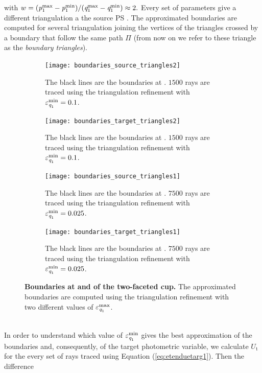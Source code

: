 with $w= (\textit{p}_1^{\textrm{max}}-\textit{p}_1^{\textrm{min}})/(\textit{q}_1^{\textrm{max}}-\textit{q}_1^{\textrm{min}})\approx 2.$ 
Every set of parameters give a different triangulation a the source PS . The approximated boundaries are computed for several triangulation joining the vertices of the triangles crossed by a boundary that follow the same path $\Pi$ (from now on we refer to these triangle as the \textit{boundary triangles}). 
\begin{figure}[h!]
\centering
\begin{subfigure}{.45\textwidth}
  \texttt{[image: boundaries\_source\_triangles2]}
 \caption{The black lines are the boundaries at . $1500$ rays are traced using the triangulation refinement with $\varepsilon_{\textit{q}_1}^{\textrm{min}}=0.1$. }
  \label{fig:boundaries_s2}
\end{subfigure}%
\hfill
\begin{subfigure}{.45\textwidth}
  \texttt{[image: boundaries\_target\_triangles2]}
  \caption{The black lines are the boundaries at . $1500$ rays are traced using the triangulation refinement with $\varepsilon_{\textit{q}_1}^{\textrm{min}}=0.1$.} %
  \label{fig:boundaries_t2}
\end{subfigure} %
\hfill
\begin{subfigure}{.45\textwidth}
  \texttt{[image: boundaries\_source\_triangles1]}
  \caption{The black lines are the boundaries at . $7500$ rays are traced using the triangulation refinement with $\varepsilon_{\textit{q}_1}^{\textrm{min}}=0.025$.}
  \label{fig:boundaries_s1}
\end{subfigure}%
\hfill
\begin{subfigure}{.45\textwidth}
  \texttt{[image: boundaries\_target\_triangles1]}
 \caption{The black lines are the boundaries at . $7500$ rays are traced using the triangulation refinement with $\varepsilon_{\textit{q}_1}^{\textrm{min}}=0.025$.} %
  \label{fig:boundaries_t1}
\end{subfigure}
\caption{\textbf{Boundaries at  and  of the two-faceted cup.} The approximated boundaries are computed using the triangulation refinement with two different values of $\varepsilon_{\textit{q}_1}^{\textrm{max}}$.}
\label{fig:boundaries_cup}
\end{figure} 
\\ \indent In order to understand which value of  $\varepsilon_{\textit{q}_1}^{\textrm{min}}$ gives the best approximation of the boundaries and, consequently, of the target photometric variable, we calculate $U_{\textrm{t}}$ for the every set of rays traced using Equation (\ref{eq:etenduetarg1}). Then the difference 
